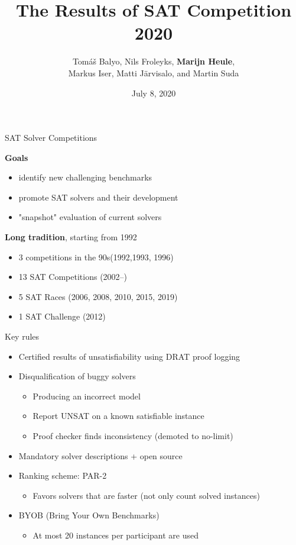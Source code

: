 \documentclass{beamer}
\title[SAT Competition 2020]{The Results of SAT Competition 2020}
\author[Balyo, Froleyks, Heule, Iser, J\"{a}rvisalo, Suda] {Tom{\'a}{\v s} Balyo, Nils Froleyks, {\bf Marijn Heule},\\
Markus Iser, Matti J\"{a}rvisalo, and Martin Suda}
\institute[] %
{
SAT 2020 Conference, Alghero, Italy (virtually) \\ %
}
\date{July 8, 2020} %
\begin{document}
\begin{frame}
\titlepage %
\end{frame}

\begin{frame}{SAT Solver Competitions}

{\bf Goals}
\begin{itemize}
\item identify new challenging benchmarks
\item promote SAT solvers and their development
\item "snapshot" evaluation of current solvers
\end{itemize}

\bigskip

{\bf Long tradition}, starting from 1992
\begin{itemize}
\item 3 competitions in the 90s\hfill (1992,1993, 1996)
\item 13 SAT Competitions \hfill (2002--)
\item 5 SAT Races \hfill (2006, 2008, 2010, 2015, 2019)
\item 1 SAT Challenge \hfill (2012)
\end{itemize}

\end{frame}


\begin{frame}{Key rules}

\begin{itemize}
\item Certified results of unsatisfiability using DRAT proof logging
\medskip
\item Disqualification of buggy solvers
  \begin{itemize}
  \item Producing an incorrect model
  \item Report UNSAT on a known satisfiable instance
  \item Proof checker finds inconsistency (demoted to no-limit)
  \end{itemize}
\medskip
\item Mandatory solver descriptions + open source
\medskip
\item Ranking scheme: PAR-2
\begin{itemize}
\item Favors solvers that are faster (not only count solved instances)
\end{itemize}
\medskip
\item BYOB (Bring Your Own Benchmarks)
\begin{itemize}
\item At most 20 instances per participant are used
\end{itemize} 
\end{itemize}

\end{frame}
\end{document}
